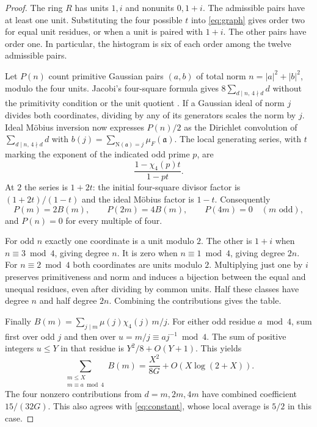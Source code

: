 \documentclass[11pt,letterpaper]{amsart}
\theoremstyle{definition}
\numberwithin{equation}{section}
\newcommand{\NN}{\mathrm N}
\begin{document}
\begin{proof}
The ring \(R\) has units \(1,i\) and nonunits \(0,1+i\).
The admissible pairs have at least one unit. Substituting the four
possible \(t\) into \eqref{eq:graph} gives order two for equal
unit residues, or when a unit is paired with \(1+i\). The other
pairs have order one. In particular, the histogram is six of
each order among the twelve admissible pairs.

Let \(P(n)\) count primitive Gaussian pairs \((a,b)\) of total norm
\(n=|a|^2+|b|^2\), modulo the four units.
Jacobi's four-square formula gives \(8\sum_{d\mid n,\,4\nmid d}d\)
without the primitivity condition or the unit quotient
\cite{HardyWright}. If a Gaussian ideal of norm \(j\) divides both
coordinates, dividing by any of its generators scales the norm
by \(j\). Ideal M\"obius inversion now expresses \(P(n)/2\) as the
Dirichlet convolution of \(\sum_{d\mid n,\,4\nmid d}d\) with
\(b(j)=\sum_{\NN(\mathfrak a)=j}\mu_F(\mathfrak a)\).
The local generating series, with \(t\) marking the exponent of
the indicated odd prime \(p\), are
\[
 \frac{1-\chi_4(p)t}{1-pt}.
\]
At \(2\) the series is \(1+2t\): the initial four-square
divisor factor is \((1+2t)/(1-t)\) and the ideal M\"obius factor
is \(1-t\). Consequently
\[
 P(m)=2B(m),\qquad P(2m)=4B(m),\qquad P(4m)=0
 \quad(m\text{ odd}),
\]
and \(P(n)=0\) for every multiple of four.

For odd \(n\) exactly one coordinate is a unit modulo \(2\).
The other is \(1+i\) when \(n\equiv3\bmod4\), giving degree \(n\).
It is zero when \(n\equiv1\bmod4\), giving degree \(2n\).
For \(n\equiv2\bmod4\) both coordinates are units modulo \(2\).
Multiplying just one by \(i\) preserves primitiveness and norm and
induces a bijection between the equal and unequal residues, even
after dividing by common units. Half these classes have degree
\(n\) and half degree \(2n\). Combining the contributions gives
the table.

Finally \(B(m)=\sum_{j\mid m}\mu(j)\chi_4(j)\,m/j\).
For either odd residue \(a\bmod4\), sum first over odd \(j\) and
then over \(u=m/j\equiv aj^{-1}\bmod4\). The sum of positive
integers \(u\le Y\) in that residue is \(Y^2/8+O(Y+1)\). This
yields
\[
 \sum_{\substack{m\le X\\m\equiv a\bmod4}} B(m)
   =\frac{X^2}{8G}+O(X\log(2+X)).
\]
The four nonzero contributions from \(d=m,2m,4m\) have combined
coefficient \(15/(32G)\). This also agrees with
\eqref{eq:constant}, whose local average is \(5/2\) in this case.
\end{proof}
\end{document}
